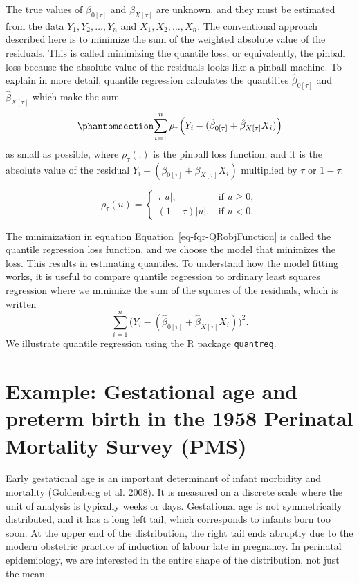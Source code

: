 \documentclass[
  letterpaper,
  DIV=11,
  numbers=noendperiod]{scrartcl}
\begin{document}
The true values of \(\beta_{0 [\tau]}\) and \(\beta_{X [\tau]}\) are
unknown, and they must be estimated from the data
\(Y_1, Y_2, \dots, Y_n\) and \(X_1, X_2, \dots, X_n\). The conventional
approach described here is to minimize the sum of the weighted absolute
value of the residuals. This is called minimizing the quantile loss, or
equivalently, the pinball loss because the absolute value of the
residuals looks like a pinball machine. To explain in more detail,
quantile regression calculates the quantities \(\hat{\beta}_{0 [\tau]}\)
and \(\hat{\beta}_{X [\tau]}\) which make the sum
\begin{equation}\protect\phantomsection\label{eq-fqr-QRobjFunction}{
\begin{aligned}
\sum_{i=1}^n \rho_\tau\Big( Y_i - (\hat{\beta}_{0 [\tau]} + \hat{\beta}_{X [\tau]} X_i) \Big)
\end{aligned}
}\end{equation} as small as possible, where \(\rho_\tau(.)\) is the
pinball loss function, and it is the absolute value of the residual
\(Y_i - (\beta_{0 [\tau]} + \beta_{X [\tau]} X_i)\) multiplied by
\(\tau\) or \(1-\tau\).

\[
\rho_\tau(u) =
\begin{cases}
\tau |u|, & \text{if } u \geq 0, \\
(1-\tau)|u|, & \text{if } u < 0.
\end{cases}
\]

The minimization in equation Equation~\ref{eq-fqr-QRobjFunction} is
called the quantile regression loss function, and we choose the model
that minimizes the loss. This results in estimating quantiles. To
understand how the model fitting works, it is useful to compare quantile
regression to ordinary least squares regression where we minimize the
sum of the squares of the residuals, which is written
\[\sum_{i=1}^n \Big( Y_i - (\hat{\beta}_{0 [\tau]} + \hat{\beta}_{X [\tau]} X_i) \Big)^2.\]
We illustrate quantile regression using the R package \texttt{quantreg}.

\section{Example: Gestational age and preterm birth in the 1958
Perinatal Mortality Survey
(PMS)}\label{example-gestational-age-and-preterm-birth-in-the-1958-perinatal-mortality-survey-pms}

Early gestational age is an important determinant of infant morbidity
and mortality (Goldenberg et al. 2008). It is measured on a discrete
scale where the unit of analysis is typically weeks or days. Gestational
age is not symmetrically distributed, and it has a long left tail, which
corresponds to infants born too soon. At the upper end of the
distribution, the right tail ends abruptly due to the modern obstetric
practice of induction of labour late in pregnancy. In perinatal
epidemiology, we are interested in the entire shape of the distribution,
not just the mean.
\end{document}
